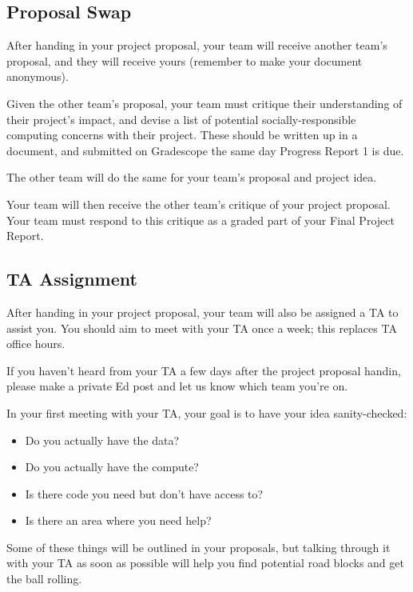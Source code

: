 \subsection*{Proposal Swap}

After handing in your project proposal, your team will receive another team's proposal, and they will receive yours (remember to make your document anonymous).

Given the other team's proposal, your team must critique their understanding of their project's impact, and devise a list of potential socially-responsible computing concerns with their project. These should be written up in a document, and submitted on Gradescope the same day Progress Report 1 is due.

The other team will do the same for your team's proposal and project idea.

Your team will then receive the other team's critique of your project proposal. 
Your team must respond to this critique as a graded part of your Final Project Report.

\subsection*{TA Assignment}

After handing in your project proposal, your team will also be assigned a TA to assist you. 
You should aim to meet with your TA once a week; this replaces TA office hours.

If you haven't heard from your TA a few days after the project proposal handin, please make a private Ed post and let us know which team you're on.

In your first meeting with your TA, your goal is to have your idea sanity-checked:

\begin{itemize}
  \item Do you actually have the data?
  \item Do you actually have the compute?
  \item Is there code you need but don't have access to?
  \item Is there an area where you need help?
\end{itemize}

Some of these things will be outlined in your proposals, but talking through it with your TA as soon as possible will help you find potential road blocks and get the ball rolling.

